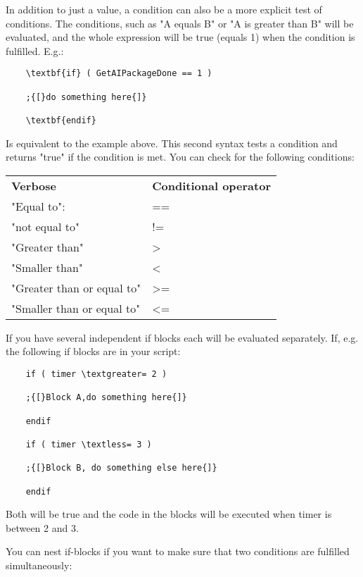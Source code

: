 In addition to just a value, a condition can also be a more explicit
test of conditions. The conditions, such as "A equals B" or "A is
greater than B" will be evaluated, and the whole expression will be true
(equals 1) when the condition is fulfilled. E.g.:

\begin{lstlisting}
	\textbf{if} ( GetAIPackageDone == 1 )
	
	;{[}do something here{]}
	
	\textbf{endif}
\end{lstlisting}

Is equivalent to the example above. This second syntax tests a condition
and returns "true" if the condition is met. You can check for the
following conditions:

\begin{longtable}[]{@{}
  >{\raggedright\arraybackslash}p{}
  >{\raggedright\arraybackslash}p{}@{}}
\toprule
\endhead
\textbf{Verbose} & \textbf{Conditional operator} \\
"Equal to": & == \\
"not equal to" & != \\
"Greater than" & \textgreater{} \\
"Smaller than" & \textless{} \\
"Greater than or equal to" & \textgreater= \\
"Smaller than or equal to" & \textless= \\
\bottomrule
\end{longtable}

If you have several independent if blocks each will be evaluated
separately. If, e.g. the following if blocks are in your script:

\begin{lstlisting}
	if ( timer \textgreater= 2 )
	
	;{[}Block A,do something here{]}
	
	endif
	
	if ( timer \textless= 3 )
	
	;{[}Block B, do something else here{]}
	
	endif
\end{lstlisting}

Both will be true and the code in the blocks will be executed when timer
is between 2 and 3.

You can nest if-blocks if you want to make sure that two conditions are
fulfilled simultaneously:

